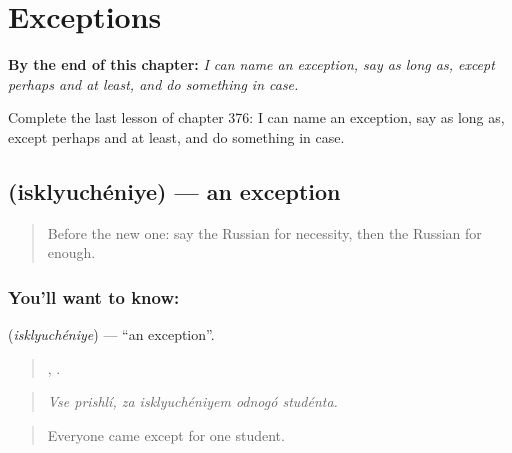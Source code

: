 
\chapter{Exceptions}
\label{ch:ru-exceptions}

\begin{chapteropening}
\textbf{By the end of this chapter:} \emph{I can name an exception, say as long as, except perhaps and at least, and do something in case.}

Complete the last lesson of chapter 376: I can name an exception, say as long as, except perhaps and at least, and do something in case.
\end{chapteropening}

\section[\texorpdfstring{\ru{исключение} (isklyuchéniye)}{исключение (isklyuchéniye)}]{ (isklyuchéniye) — an exception}

\label{lesson:RU-C376-isklyuchenie}



\begin{quote}
Before the new one: say the Russian for necessity, then the Russian for enough.
\end{quote}

\subsection*{You'll want to know: }
\textbf{} (\emph{isklyuchéniye}) — \textquotedblleft{}an exception\textquotedblright{}.

\begin{quote}
 ,    .
\end{quote}

\begin{quote}
\emph{Vse prishlí, za isklyuchéniyem odnogó studénta.}
\end{quote}

\begin{quote}
Everyone came except for one student.
\end{quote}

